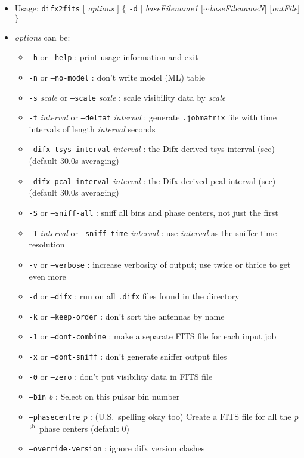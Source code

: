 \begin{itemize}
\item[] Usage: {\tt difx2fits} $[$ {\em options} $]$ $\{$ {\tt -d} $\mid$ {\em baseFilename1} $[\cdots${\em baseFilenameN}$]$ $[${\em outFile}$]$ $\}$
\item[] {\em options} can be:
\begin{itemize}
\item[] {\tt -h} or {\tt --help} : print usage information and exit
\item[] {\tt -n} or {\tt --no-model} : don't write model (ML) table
\item[] {\tt -s} {\em scale} or {\tt --scale} {\em scale} : scale visibility data by {\em scale}
\item[] {\tt -t} {\em interval} or {\tt --deltat} {\em interval} : generate {\tt .jobmatrix} file with time intervals of length {\em interval} seconds
\item[] {\tt --difx-tsys-interval} {\em interval} : the Difx-derived tsys interval (sec) (default 30.0s averaging)
\item[] {\tt --difx-pcal-interval} {\em interval} : the Difx-derived pcal interval (sec) (default 30.0s averaging)
\item[] {\tt -S} or {\tt --sniff-all} : sniff all bins and phase centers, not just the first
\item[] {\tt -T} {\em interval} or {\tt --sniff-time} {\em interval} : use {\em interval} as the sniffer time resolution
\item[] {\tt -v} or {\tt --verbose} : increase verbosity of output; use twice or thrice to get even more
\item[] {\tt -d} or {\tt --difx} : run on all {\tt .difx} files found in the directory
\item[] {\tt -k} or {\tt --keep-order} : don't sort the antennas by name
\item[] {\tt -1} or {\tt --dont-combine} : make a separate FITS file for each input job
\item[] {\tt -x} or {\tt --dont-sniff} : don't generate sniffer output files
\item[] {\tt -0} or {\tt --zero} : don't put visibility data in FITS file
\item[] {\tt --bin} {\em b} : Select on this pulsar bin number
\item[] {\tt --phasecentre} {\em p} : (U.S.\ spelling okay too) Create a FITS file for all the {\em p}$^{\rm th}$ phase centers (default 0)
\item[] {\tt --override-version} : ignore difx version clashes

\end{itemize}
\end{itemize}
